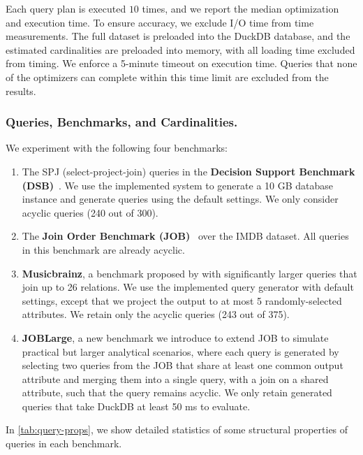 Each query plan is executed $10$ times, and we report the median optimization and execution time. To ensure accuracy, we exclude I/O time from time measurements. The full dataset is preloaded into the DuckDB database, and the estimated cardinalities are preloaded into memory, with all loading time excluded from timing. We enforce a 5-minute timeout on execution time. Queries that none of the optimizers can complete within this time limit are excluded from the results.

\subsubsection{Queries, Benchmarks, and Cardinalities.} We experiment with the following four benchmarks:
\begin{enumerate}[leftmargin=*]
    \item The SPJ (select-project-join) queries in the \textbf{Decision Support Benchmark (DSB)}~\cite{ding_dsb_2021}. We use the implemented system to generate a 10 GB database instance and generate queries using the default settings. We only consider acyclic queries (240 out of 300). 
    \item The \textbf{Join Order Benchmark (JOB)}~\cite{leis_query_2018} over the IMDB dataset. All queries in this benchmark are already acyclic.
    \item \textbf{Musicbrainz}, a benchmark proposed by \cite{mancini_efficient_2022} with significantly larger queries that join up to 26 relations. We use the implemented query generator with default settings, except that we project the output to at most 5 randomly-selected attributes. We retain only the acyclic queries (243 out of 375).
    \item \textbf{JOBLarge}, a new benchmark we introduce to extend JOB to simulate practical but larger analytical scenarios, where each query is generated by selecting two queries from the JOB that share at least one common output attribute and merging them into a single query, with a join on a shared attribute, such that the query remains acyclic. 
We only retain generated queries that take DuckDB at least 50 ms to evaluate.
\end{enumerate}
In \cref{tab:query-props}, we show detailed statistics of some structural properties of queries in each benchmark.



